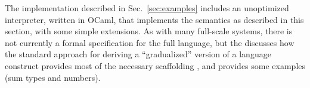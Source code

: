 The \Hazel implementation described in Sec.~\ref{sec:examples}
includes an unoptimized interpreter, written in OCaml, that implements the semantics as described
in this section, with some simple extensions. As with many full-scale systems, there is not currently a formal
specification for the full \Hazel language, but the \appendixName
discusses how the standard approach for deriving a ``gradualized'' version of a
language construct provides most of the necessary scaffolding \cite{DBLP:conf/popl/CiminiS16}, and provides some examples (sum types and numbers).




